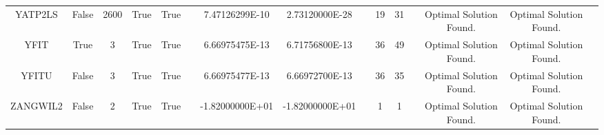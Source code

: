 \begin{longtable}{ccccccccccccccc}
	\cellcolor{default2} YATP2LS& \cellcolor{default2} False& \cellcolor{default2} 2600& \cellcolor{default2} True& \cellcolor{default2} True& \cellcolor{header} & \cellcolor{ok} 7.47126299E-10& \cellcolor{best} 2.73120000E-28& \cellcolor{header} & \cellcolor{best} 19& \cellcolor{ok} 31& \cellcolor{header} & \cellcolor{default2} Optimal Solution Found.& \cellcolor{default2} Optimal Solution Found.& \cellcolor{header} \\
	\cellcolor{default1} YFIT& \cellcolor{default1} True& \cellcolor{default1} 3& \cellcolor{default1} True& \cellcolor{default1} True& \cellcolor{header} & \cellcolor{best} 6.66975475E-13& \cellcolor{ok} 6.71756800E-13& \cellcolor{header} & \cellcolor{best} 36& \cellcolor{ok} 49& \cellcolor{header} & \cellcolor{default1} Optimal Solution Found.& \cellcolor{default1} Optimal Solution Found.& \cellcolor{header} \\
	\cellcolor{default2} YFITU& \cellcolor{default2} False& \cellcolor{default2} 3& \cellcolor{default2} True& \cellcolor{default2} True& \cellcolor{header} & \cellcolor{ok} 6.66975477E-13& \cellcolor{best} 6.66972700E-13& \cellcolor{header} & \cellcolor{ok} 36& \cellcolor{best} 35& \cellcolor{header} & \cellcolor{default2} Optimal Solution Found.& \cellcolor{default2} Optimal Solution Found.& \cellcolor{header} \\
	\cellcolor{default1} ZANGWIL2& \cellcolor{default1} False& \cellcolor{default1} 2& \cellcolor{default1} True& \cellcolor{default1} True& \cellcolor{header} & \cellcolor{best} -1.82000000E+01& \cellcolor{ok} -1.82000000E+01& \cellcolor{header} & \cellcolor{best} 1& \cellcolor{best} 1& \cellcolor{header} & \cellcolor{default1} Optimal Solution Found.& \cellcolor{default1} Optimal Solution Found.& \cellcolor{header} \\
\end{longtable}